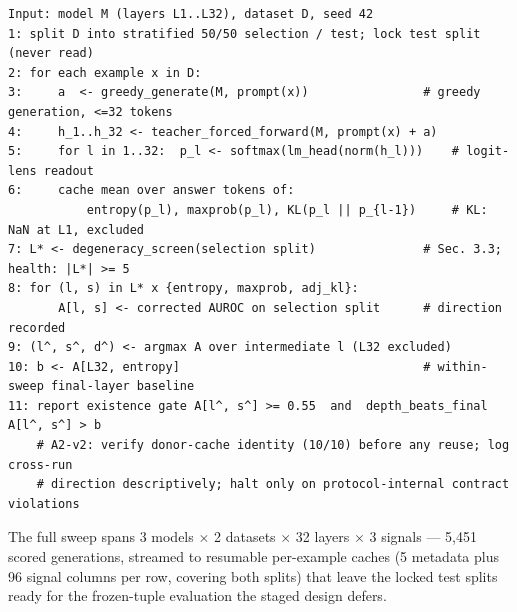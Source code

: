 \begin{verbatim}
Input: model M (layers L1..L32), dataset D, seed 42
1: split D into stratified 50/50 selection / test; lock test split (never read)
2: for each example x in D:
3:     a  <- greedy_generate(M, prompt(x))                # greedy generation, <=32 tokens
4:     h_1..h_32 <- teacher_forced_forward(M, prompt(x) + a)
5:     for l in 1..32:  p_l <- softmax(lm_head(norm(h_l)))    # logit-lens readout
6:     cache mean over answer tokens of:
           entropy(p_l), maxprob(p_l), KL(p_l || p_{l-1})     # KL: NaN at L1, excluded
7: L* <- degeneracy_screen(selection split)               # Sec. 3.3; health: |L*| >= 5
8: for (l, s) in L* x {entropy, maxprob, adj_kl}:
       A[l, s] <- corrected AUROC on selection split      # direction recorded
9: (l^, s^, d^) <- argmax A over intermediate l (L32 excluded)
10: b <- A[L32, entropy]                                  # within-sweep final-layer baseline
11: report existence gate A[l^, s^] >= 0.55  and  depth_beats_final A[l^, s^] > b
    # A2-v2: verify donor-cache identity (10/10) before any reuse; log cross-run
    # direction descriptively; halt only on protocol-internal contract violations
\end{verbatim}

The full sweep spans 3 models $\times$ 2 datasets $\times$ 32 layers $\times$ 3 signals --- 5,451 scored generations, streamed to resumable per-example caches (5 metadata plus 96 signal columns per row, covering both splits) that leave the locked test splits ready for the frozen-tuple evaluation the staged design defers.

